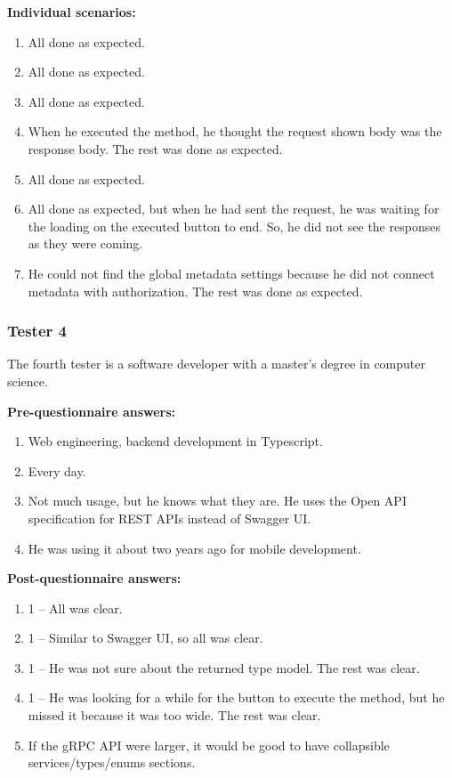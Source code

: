 \textbf{Individual scenarios:}
\begin{enumerate}
    \item All done as expected.
    \item All done as expected.
    \item All done as expected.
    \item When he executed the method, he thought the request shown body was the response body.
    The rest was done as expected.
    \item All done as expected.
    \item All done as expected, but when he had sent the request, he was waiting for the loading on the executed button to end.
    So, he did not see the responses as they were coming.
    \item He could not find the global metadata settings because he did not connect metadata with authorization.
    The rest was done as expected.
\end{enumerate}

\subsubsection{Tester 4}
The fourth tester is a software developer with a master's degree in computer science.

\textbf{Pre-questionnaire answers:}
\begin{enumerate}
    \item Web engineering, backend development in Typescript.
    \item Every day.
    \item Not much usage, but he knows what they are.
    He uses the Open API specification for REST APIs instead of Swagger UI\@.
    \item He was using it about two years ago for mobile development.
\end{enumerate}

\textbf{Post-questionnaire answers:}
\begin{enumerate}
    \item 1 -- All was clear.
    \item 1 -- Similar to Swagger UI, so all was clear.
    \item 1 -- He was not sure about the returned type model.
    The rest was clear.
    \item 1 -- He was looking for a while for the button to execute the method, but he missed it because it was too wide.
    The rest was clear.
    \item If the gRPC API were larger, it would be good to have collapsible services/types/enums sections.
\end{enumerate}

